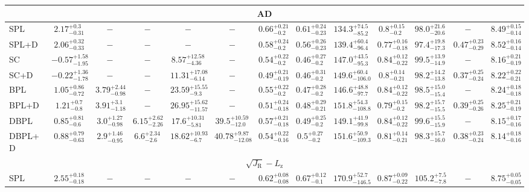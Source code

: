 \begin{table*}
{\begin{tabular}{lcccccccccccc}
\hline 
\multicolumn{13}{c}{AD} \\ 
\hline 
SPL & $2.17^{+0.3}_{-0.31}$ & $-$ & $-$ & $-$ & $-$ & $0.66^{+0.21}_{-0.2}$ & $0.61^{+0.24}_{-0.23}$ & $134.3^{+74.5}_{-85.2}$ & $0.8^{+0.15}_{-0.2}$ & $98.0^{+21.6}_{-20.6}$ & $-$ & $8.49^{+0.15}_{-0.14}$ \\ 
SPL+D & $2.06^{+0.32}_{-0.33}$ & $-$ & $-$ & $-$ & $-$ & $0.58^{+0.24}_{-0.2}$ & $0.56^{+0.26}_{-0.23}$ & $139.4^{+60.4}_{-96.4}$ & $0.77^{+0.16}_{-0.18}$ & $97.4^{+19.8}_{-17.3}$ & $0.47^{+0.23}_{-0.29}$ & $8.52^{+0.16}_{-0.14}$ \\ 
\rowcolor{lightgray} SC & $-0.57^{+1.58}_{-1.95}$ & $-$ & $-$ & $8.57^{+12.58}_{-4.36}$ & $-$ & $0.54^{+0.22}_{-0.2}$ & $0.46^{+0.27}_{-0.2}$ & $147.0^{+43.5}_{-95.3}$ & $0.84^{+0.12}_{-0.22}$ & $99.5^{+13.9}_{-14.9}$ & $-$ & $8.16^{+0.21}_{-0.19}$ \\ 
SC+D & $-0.22^{+1.36}_{-1.78}$ & $-$ & $-$ & $11.31^{+17.08}_{-6.14}$ & $-$ & $0.49^{+0.21}_{-0.19}$ & $0.46^{+0.31}_{-0.2}$ & $149.6^{+60.4}_{-106.0}$ & $0.8^{+0.14}_{-0.21}$ & $98.2^{+14.2}_{-13.8}$ & $0.37^{+0.25}_{-0.24}$ & $8.22^{+0.22}_{-0.21}$ \\ 
BPL & $1.05^{+0.86}_{-0.72}$ & $3.79^{+2.44}_{-0.98}$ & $-$ & $23.59^{+15.55}_{-9.3}$ & $-$ & $0.55^{+0.22}_{-0.2}$ & $0.47^{+0.28}_{-0.2}$ & $146.6^{+48.8}_{-97.7}$ & $0.84^{+0.12}_{-0.22}$ & $98.5^{+15.0}_{-15.4}$ & $-$ & $8.24^{+0.18}_{-0.18}$ \\ 
BPL+D & $1.21^{+0.7}_{-0.8}$ & $3.91^{+3.1}_{-1.18}$ & $-$ & $26.95^{+15.62}_{-11.57}$ & $-$ & $0.51^{+0.24}_{-0.18}$ & $0.48^{+0.29}_{-0.21}$ & $151.8^{+54.3}_{-108.8}$ & $0.79^{+0.15}_{-0.2}$ & $98.2^{+15.7}_{-15.5}$ & $0.39^{+0.25}_{-0.26}$ & $8.25^{+0.21}_{-0.19}$ \\ 
DBPL & $0.85^{+0.81}_{-0.6}$ & $3.0^{+1.27}_{-0.98}$ & $6.15^{+2.62}_{-2.26}$ & $17.6^{+10.31}_{-5.81}$ & $39.5^{+10.59}_{-12.0}$ & $0.57^{+0.21}_{-0.18}$ & $0.49^{+0.25}_{-0.2}$ & $149.1^{+41.9}_{-99.8}$ & $0.84^{+0.12}_{-0.22}$ & $99.6^{+15.5}_{-15.9}$ & $-$ & $8.15^{+0.17}_{-0.16}$ \\ 
DBPL+D & $0.88^{+0.79}_{-0.63}$ & $2.9^{+1.46}_{-0.95}$ & $6.6^{+2.34}_{-2.6}$ & $18.62^{+10.93}_{-6.7}$ & $40.78^{+9.87}_{-12.08}$ & $0.54^{+0.22}_{-0.16}$ & $0.5^{+0.27}_{-0.2}$ & $151.6^{+50.9}_{-109.3}$ & $0.81^{+0.14}_{-0.21}$ & $98.3^{+15.7}_{-16.0}$ & $0.38^{+0.23}_{-0.24}$ & $8.14^{+0.18}_{-0.16}$ \\ 
\hline 
\multicolumn{13}{c}{$\sqrt{J_\mathrm{R}}-L_\mathrm{z}$} \\ 
\hline 
SPL & $2.55^{+0.18}_{-0.18}$ & $-$ & $-$ & $-$ & $-$ & $0.62^{+0.08}_{-0.08}$ & $0.67^{+0.12}_{-0.1}$ & $170.9^{+52.7}_{-146.5}$ & $0.87^{+0.09}_{-0.22}$ & $105.2^{+7.5}_{-7.8}$ & $-$ & $8.75^{+0.05}_{-0.05}$ \\ 

\end{tabular}}
\end{table*}
